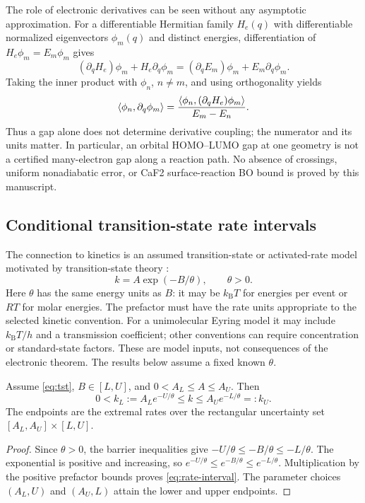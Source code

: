The role of electronic derivatives can be seen without any asymptotic
approximation. For a differentiable Hermitian family $H_e(q)$ with
differentiable normalized eigenvectors $\phi_m(q)$ and distinct energies,
differentiation of $H_e\phi_m=E_m\phi_m$ gives
\[
 (\partial_q H_e)\phi_m+H_e\partial_q\phi_m
 =(\partial_qE_m)\phi_m+E_m\partial_q\phi_m.
\]
Taking the inner product with $\phi_n$, $n\ne m$, and using
orthogonality yields
\begin{equation}
 \left\langle \phi_n,\partial_q\phi_m\right\rangle
 =\frac{\left\langle \phi_n,(\partial_qH_e)\phi_m\right\rangle}{E_m-E_n}.
 \label{eq:derivative-coupling}
\end{equation}
Thus a gap alone does not determine derivative coupling; the numerator and
its units matter. In particular, an orbital HOMO--LUMO gap at one geometry
is not a certified many-electron gap along a reaction path. No absence of
crossings, uniform nonadiabatic error, or CaF2 surface-reaction BO bound is
proved by this manuscript.

\subsection{Conditional transition-state rate intervals}
The connection to kinetics is an assumed transition-state or activated-rate
model motivated by transition-state theory \citep{Eyring1935}:
\begin{equation}
 k=A\exp(-B/\theta),\qquad \theta>0.
 \label{eq:tst}
\end{equation}
Here $\theta$ has the same energy units as $B$: it may be $k_{\mathrm B}T$
for energies per event or $RT$ for molar energies. The prefactor must have
the rate units appropriate to the selected kinetic convention. For a
unimolecular Eyring model it may include $k_{\mathrm B}T/h$ and a
transmission coefficient; other conventions can require concentration or
standard-state factors. These are model inputs, not consequences of the
electronic theorem. The results below assume a fixed known $\theta$.

\begin{theorem}
\label{thm:rate}
Assume \eqref{eq:tst}, $B\in[L,U]$, and
$0<A_L\le A\le A_U$. Then
\begin{equation}
 0<k_L:=A_L e^{-U/\theta}\le k\le A_U e^{-L/\theta}=:k_U.
 \label{eq:rate-interval}
\end{equation}
The endpoints are the extremal rates over the rectangular uncertainty set
$[A_L,A_U]\times[L,U]$.
\end{theorem}
\begin{proof}
Since $\theta>0$, the barrier inequalities give
$-U/\theta\le-B/\theta\le-L/\theta$.
The exponential is positive and increasing, so
$e^{-U/\theta}\le e^{-B/\theta}\le e^{-L/\theta}$.
Multiplication by the positive prefactor bounds proves
\eqref{eq:rate-interval}. The parameter choices $(A_L,U)$ and $(A_U,L)$
attain the lower and upper endpoints.
\end{proof}

